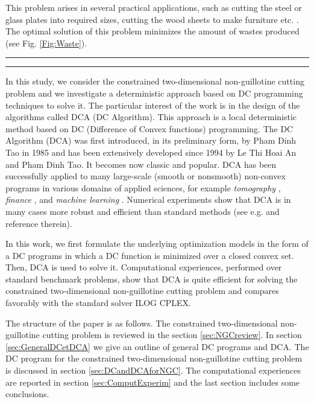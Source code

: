 \documentclass{iesmart}
\begin{document}
This problem arises in several practical applications, such as
cutting the steel or glass plates into required sizes, cutting the
wood sheets to make furniture etc. \cite{Beasley1985}. The optimal
solution of this problem minimizes the amount of wastes produced
(see Fig. \ref{Fig:Waste}).

\begin{figure*}
\hrule
{}\hrule \caption{A two-dimensional non-guillotine cutting pattern in which
the produced wastes are minimized} \label{Fig:Waste}
\end{figure*}

In this study, we consider the constrained two-dimensional
non-guillotine cutting problem and we investigate a deterministic
approach based on DC programming techniques to solve it. The
particular interest of the work is in the design of the algorithms
called DCA (DC Algorithm). This approach is a local deterministic
method based on DC (Difference of Convex functions) programming.
The DC Algorithm (DCA) was first introduced, in its preliminary
form, by Pham Dinh Tao in 1985 and has been extensively developed
since 1994 by Le Thi Hoai An and Pham Dinh Tao. It becomes now
classic and popular. DCA has been successfully applied to many
large-scale (smooth or nonsmooth) non-convex programs in various
domains of applied sciences, for example \emph{tomography}
\cite{WSSH04}, \emph{finance}
\cite{Moeini2009a,Moeini2009b,Moeini2010}, and \emph{machine
learning} \cite{Liu:jcgs05,neuman,Ronan:icml06}. Numerical
experiments show that DCA is in many cases more robust and
efficient than standard methods (see e.g.
\cite{Harring05,lethithesis,lethi2005,Moeini2009a,Moeini2009b,Liu:jcgs05,Moeini2010,neuman,PLT97,PLT98,WSSH04}
and reference therein).

In this work, we first formulate the underlying optimization
models in the form of a DC programs in which a DC function is
minimized over a closed convex set. Then, DCA is used to solve it.
Computational experiences, performed over standard benchmark
problems, show that DCA is quite efficient for solving the
constrained two-dimensional non-guillotine cutting problem and
compares favorably with the standard solver ILOG CPLEX.

The structure of the paper is as follows. The constrained
two-dimensional non-guillotine cutting problem is reviewed in the
section \ref{sec:NGCreview}. In section \ref{sec:GeneralDCetDCA}
we give an outline of general DC programs and DCA. The DC program
for the constrained two-dimensional non-guillotine cutting problem
is discussed in section \ref{sec:DCandDCAforNGC}. The
computational experiences are reported in section
\ref{sec:ComputExperim} and the last section includes some
conclusions.
\end{document}

